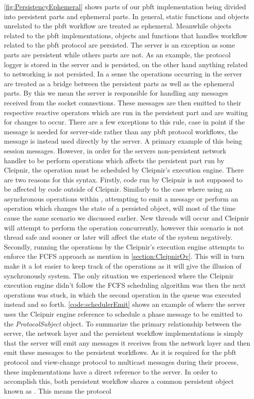 \autoref{fig:PersistencyEphemeral} shows parts of our \ac{pbft} implementation being divided into persistent parts and ephemeral parts. In general, static functions and objects unrelated to the \ac{pbft} workflow are treated as ephemeral. Meanwhile objects related to the \ac{pbft} implementations,  objects and functions that handles workflow related to the \ac{pbft} protocol are persisted. The server is an exception as some parts are persistent while others parts are not. As an example, the protocol logger is stored in the server and is persisted, on the other hand anything related to networking is not persisted. In a sense the operations occurring in the server are treated as a bridge between the persistent parts as well as the ephemeral parts. By this we mean the server is responsible for handling any messages received from the socket connections. These messages are then emitted to their respective reactive operators which are run in the persistent part and are waiting for changes to occur. There are a few exceptions to this rule, case in point if the message is needed for server-side rather than any \ac{pbft} protocol workflows, the message is instead used directly by the server. A primary example of this being session messages. However, in order for the servers non-persistent network handler to be perform operations which affects the persistent part run by Cleipnir, the operation must be scheduled by Cleipnir's execution engine. There are two reasons for this syntax. Firstly, code run by Cleipnir is not supposed to be affected by code outside of Cleipnir. Similarly to the case where using an asynchronous operations within , attempting to emit a message or perform an operation which changes the state of a persisted object, will most of the time cause the same scenario we discussed earlier. New threads will occur and Cleipnir will attempt to perform the operation concurrently, however this scenario is not thread safe and sooner or later will affect the state of the system negatively. Secondly, running the operations by the Cleipnir's execution engine attempts to enforce the FCFS approach as mention in \autoref{section:CleipnirOv}. This will in turn make it a lot easier to keep track of the operations as it will give the illusion of synchronously system. The only situation we experienced where the Cleipnir execution engine didn't follow the FCFS scheduling algorithm was then the next operations was stuck, in which the second operation in the queue was executed instead and so forth. \autoref{code:schedulerEmit} shows an example of where the server uses the Cleipnir engine reference to schedule a phase message to be emitted to the \emph{ProtocolSubject}  object. To summarize the primary relationship between the server, the network layer and the persistent workflow implementations is simply that the server will emit any messages it receives from the network layer and then emit these messages to the persistent workflows. As it is required for the \ac{pbft} protocol and view-change protocol to multicast messages during their process, these implementations have a direct reference to the server. In order to accomplish this, both persistent workflow shares a common persistent object known as . This means the protocol 